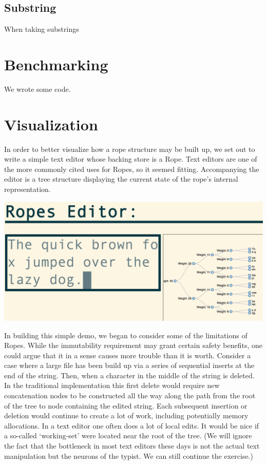 \documentclass[12pt]{article}
\begin{document}
\subsection{Substring}

When taking substrings

\section{Benchmarking}

We wrote some code.

\section{Visualization}

In order to better visualize how a rope structure may be built up, we set out to write a simple text editor whose backing store is a Rope. Text editors are one of the more commonly cited uses for Ropes, so it seemed fitting. Accompanying the editor is a tree structure displaying the current state of the rope's internal representation.

\includegraphics[scale=0.25]{editorImage1}

In building this simple demo, we began to consider some of the limitations of Ropes. While the immutability requirement may grant certain safety benefits, one could argue that it in a sense causes more trouble than it is worth. Consider a case where a large file has been build up via a series of sequential inserts at the end of the string. Then, when a character in the middle of the string is deleted. In the traditional implementation this first delete would require new concatenation nodes to be constructed all the way along the path from the root of the tree to node containing the edited string. Each subsequent insertion or deletion would continue to create a lot of work, including potentially memory allocations. In a text editor one often does a lot of local edits. It would be nice if a so-called `working-set' were located near the root of the tree. (We will ignore the fact that the bottleneck in most text editors these days is not the actual text manipulation but the neurons of the typist. We can still continue the exercise.)
\end{document}
